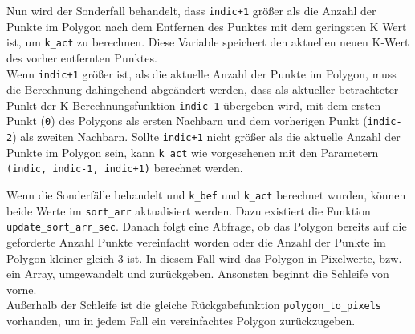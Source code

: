 {	Nun wird der Sonderfall behandelt, dass \lstinline|indic+1| größer als die Anzahl der Punkte im Polygon nach dem Entfernen des Punktes mit dem geringsten K Wert ist, um \lstinline|k_act| zu berechnen. Diese Variable speichert den aktuellen neuen K-Wert des vorher entfernten Punktes. \\
	Wenn \lstinline|indic+1| größer ist, als die aktuelle Anzahl der Punkte im Polygon, muss die Berechnung dahingehend abgeändert werden, dass als aktueller betrachteter Punkt der K Berechnungsfunktion \lstinline|indic-1| übergeben wird, mit dem ersten Punkt (\lstinline|0|) des Polygons als ersten Nachbarn und dem vorherigen Punkt (\lstinline|indic-2|) als zweiten Nachbarn. Sollte \lstinline|indic+1| nicht größer als die aktuelle Anzahl der Punkte im Polygon sein, kann \lstinline|k_act| wie vorgesehenen mit den Parametern \lstinline|(indic, indic-1, indic+1)| berechnet werden.
	\ifimportant
	
	\fi
	Wenn die Sonderfälle behandelt und \lstinline|k_bef| und \lstinline|k_act| berechnet wurden, können beide Werte im \lstinline|sort_arr| aktualisiert werden. Dazu existiert die Funktion \lstinline|update_sort_arr_sec|. Danach folgt eine Abfrage, ob das Polygon bereits auf die geforderte Anzahl Punkte vereinfacht worden oder die Anzahl der Punkte im Polygon kleiner gleich 3 ist. In diesem Fall wird das Polygon in Pixelwerte, bzw. ein Array, umgewandelt und zurückgeben. Ansonsten beginnt die Schleife von vorne. \\
	Außerhalb der Schleife ist die gleiche Rückgabefunktion \lstinline|polygon_to_pixels| vorhanden, um in jedem Fall ein vereinfachtes Polygon zurückzugeben.
	\ifimportant
	
	
	
	\fi

}
